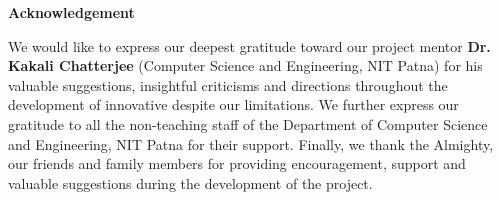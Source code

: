 \begin{center}
    \Large\textbf{Acknowledgement}
\end{center}

\vspace{1cm}

\large
We would like to express our deepest gratitude toward our project mentor \textbf{Dr. Kakali Chatterjee} (Computer Science and Engineering, NIT Patna) for his valuable suggestions, insightful criticisms and directions throughout the development of innovative despite our limitations. 
We further express our gratitude to all the non-teaching staff of the Department of Computer Science and Engineering, NIT Patna for their support. Finally, we thank the Almighty, our friends and family members for providing encouragement, support and valuable suggestions during the development of the project.
